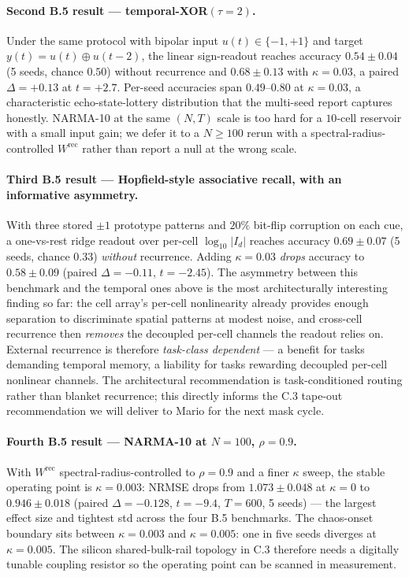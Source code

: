 \documentclass[fontsize=10pt]{article}
\begin{document}
\paragraph{Second B.5 result --- temporal-XOR$(\tau=2)$.}
Under the same protocol with bipolar input $u(t) \in \{-1, +1\}$ and target
$y(t) = u(t) \oplus u(t-2)$, the linear sign-readout reaches accuracy
$0.54 \pm 0.04$ (5 seeds, chance $0.50$) without recurrence and
$\mathbf{0.68 \pm 0.13}$ with $\kappa=0.03$, a paired $\Delta = +0.13$ at
$t = +2.7$. Per-seed accuracies span $0.49$--$0.80$ at $\kappa=0.03$, a
characteristic echo-state-lottery distribution that the multi-seed report
captures honestly. NARMA-10 at the same $(N, T)$ scale is too hard for a
$10$-cell reservoir with a small input gain; we defer it to a $N{\geq}100$
rerun with a spectral-radius-controlled $W^{\mathrm{rec}}$ rather than report
a null at the wrong scale.

\paragraph{Third B.5 result --- Hopfield-style associative recall, with an informative asymmetry.}
With three stored $\pm 1$ prototype patterns and $20\%$ bit-flip corruption on
each cue, a one-vs-rest ridge readout over per-cell $\log_{10}|I_d|$ reaches
accuracy $\mathbf{0.69 \pm 0.07}$ (5 seeds, chance $0.33$) \emph{without} recurrence.
Adding $\kappa=0.03$ \emph{drops} accuracy to $0.58 \pm 0.09$ (paired
$\Delta = -0.11$, $t = -2.45$). The asymmetry between this benchmark and the
temporal ones above is the most architecturally interesting finding so far:
the cell array's per-cell nonlinearity already provides enough separation to
discriminate spatial patterns at modest noise, and cross-cell recurrence then
\emph{removes} the decoupled per-cell channels the readout relies on. External
recurrence is therefore \emph{task-class dependent} --- a benefit for tasks
demanding temporal memory, a liability for tasks rewarding decoupled per-cell
nonlinear channels. The architectural recommendation is task-conditioned routing
rather than blanket recurrence; this directly informs the C.3 tape-out
recommendation we will deliver to Mario for the next mask cycle.

\paragraph{Fourth B.5 result --- NARMA-10 at $N=100$, $\rho=0.9$.}
With $W^{\mathrm{rec}}$ spectral-radius-controlled to $\rho=0.9$ and a finer
$\kappa$ sweep, the stable operating point is $\kappa=0.003$: NRMSE drops
from $1.073 \pm 0.048$ at $\kappa=0$ to $\mathbf{0.946 \pm 0.018}$ (paired
$\Delta = -0.128$, $t = -9.4$, $T=600$, 5 seeds) --- the largest effect size
and tightest std across the four B.5 benchmarks. The chaos-onset boundary
sits between $\kappa=0.003$ and $\kappa=0.005$: one in five seeds diverges at
$\kappa=0.005$. The silicon shared-bulk-rail topology in C.3 therefore needs
a digitally tunable coupling resistor so the operating point can be scanned
in measurement.
\end{document}
